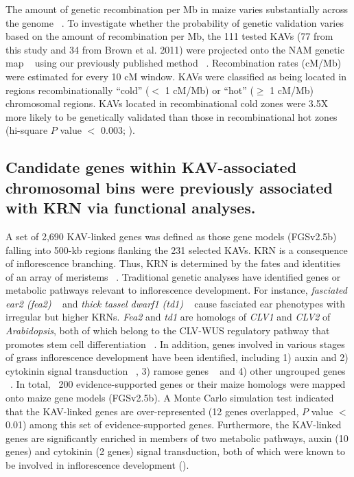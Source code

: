 \documentclass[10pt,letterpaper]{article}
\begin{document}
The amount of genetic recombination per Mb in maize varies substantially across the genome ~\cite{Fu2002}. To investigate whether the probability of genetic validation varies based on the amount of recombination per Mb, the 111 tested KAVs (77 from this study and 34 from Brown et al. 2011) were projected onto the NAM genetic map ~\cite{Buckler2009} using our previously published method ~\cite{Liu2009}. Recombination rates (cM/Mb) were estimated for every 10 cM window. KAVs were classified as being located in regions recombinationally “cold” ($<$ 1 cM/Mb) or “hot” ($\geq$ 1 cM/Mb) chromosomal regions. KAVs located in recombinational cold zones were 3.5X more likely to be genetically validated than those in recombinational hot zones (hi-square $P$ value $<$ 0.003; ). 

\subsection*{Candidate genes within KAV-associated chromosomal bins were previously associated with KRN via functional analyses.}
A set of 2,690 KAV-linked genes was defined as those gene models (FGSv2.5b) falling into 500-kb regions flanking the 231 selected KAVs. KRN is a consequence of inflorescence branching. Thus, KRN is determined by the fates and identities of an array of meristems ~\cite{Barazesh2008}. Traditional genetic analyses have identified genes or metabolic pathways relevant to inflorescence development. For instance, \emph{fasciated ear2 (fea2)} ~\cite{Bommert2013} and \emph{thick tassel dwarf1 (td1)} ~\cite{Bommert2005} cause fasciated ear phenotypes with irregular but higher KRNs. \emph{Fea2} and \emph{td1} are homologs of \emph{CLV1} and \emph{CLV2} of \emph{Arabidopsis}, both of which belong to the CLV-WUS regulatory pathway that promotes stem cell differentiation ~\cite{Clark2001}. In addition, genes involved in various stages of grass inflorescence development have been identified, including 1) auxin and 2) cytokinin signal transduction ~\cite{Barazesh2008, Sigmon2010}, 3) ramose genes ~\cite{Bortiri2006} and 4) other ungrouped genes ~\cite{McSteen2001, Upadyayula2006, Xu2011}. In total, ~200 evidence-supported genes or their maize homologs were mapped onto maize gene models (FGSv2.5b). A Monte Carlo simulation test indicated that the KAV-linked genes are over-represented (12 genes overlapped, $P$ value $<$ 0.01) among this set of evidence-supported genes. Furthermore, the KAV-linked genes are significantly enriched in members of two metabolic pathways, auxin (10 genes) and cytokinin (2 genes) signal transduction, both of which were known to be involved in inflorescence development (). 
\end{document}

